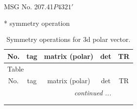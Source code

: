 \documentclass[fleqn,8pt]{jsarticle}
\begin{document}
\setcounter{MaxMatrixCols}{32}

\renewcommand{\tablename}{Table~}
\renewcommand{\figurename}{Figure~}
\begin{center}
\LARGE
MSG No. 207.41\quad$P4321'$
\end{center}
* symmetry operation
\renewcommand{\arraystretch}{1.3}
\begin{longtable}{ccccc}
\caption{Symmetry operations for 3d polar vector.}
 \\
 \hline \hline
No. & tag & matrix (polar) & det & TR \\ \hline \endfirsthead

\multicolumn{4}{l}{\tablename\ \thetable{}} \\
 \hline \hline
No. & tag & matrix (polar) & det & TR \\ \hline \endhead

 \hline \hline
\multicolumn{4}{r}{\footnotesize\it continued ...} \\ \endfoot

 \hline \hline
\multicolumn{4}{r}{} \\ \endlastfoot


\end{longtable}
\end{document}
